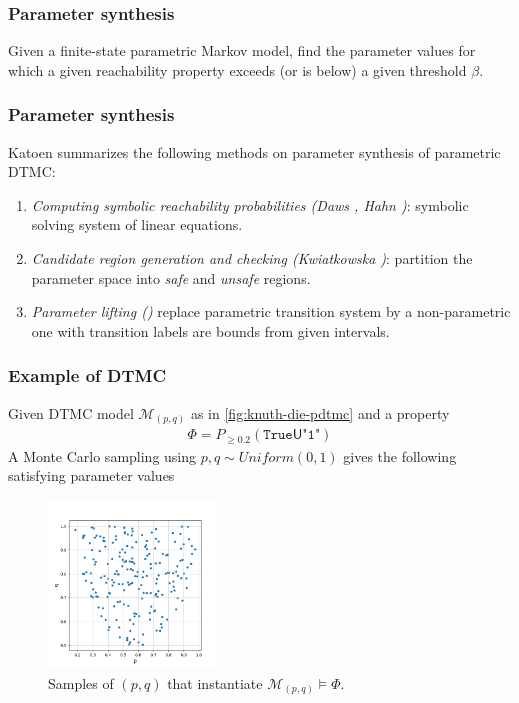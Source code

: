 \documentclass{beamer}
\begin{document}
\begin{frame}
    \frametitle{Parameter synthesis}
    \begin{definition}
        Given a finite-state parametric Markov model, find the parameter values for which a given
        reachability property exceeds (or is below) a given threshold $\beta$.
    \end{definition}
\end{frame}

\begin{frame}
    \frametitle{Parameter synthesis}
    Katoen \cite{katoen2013model} summarizes the following methods on parameter synthesis of parametric DTMC:
    \begin{enumerate}
        \item \textit{Computing symbolic reachability probabilities (Daws \cite{daws2004symbolic},
                  Hahn \cite{hahn2011probabilistic})}: symbolic solving system of linear equations.
        \item \textit{Candidate region generation and checking (Kwiatkowska
                  \cite{kwiatkowska2006symmetry})}: partition the parameter space into \textit{safe} and
              \textit{unsafe} regions.
        \item \textit{Parameter lifting (\cite{quatmann2016parameter})} replace parametric
              transition system by a non-parametric one with transition labels are bounds from given
              intervals.
    \end{enumerate}
\end{frame}

\begin{frame}
    \frametitle{Example of DTMC}
    Given DTMC model $\mathcal{M}_{(p,q)}$ as in \ref{fig:knuth-die-pdtmc} and a property
    \begin{align*}
        \Phi = P_{\geq 0.2} (\texttt{True} \mathsf{U} \texttt{"1"})
    \end{align*}
    A Monte Carlo sampling using $p,q \sim Uniform(0,1)$ gives the following satisfying parameter values
    \begin{figure}[H]
        \centering
        \includegraphics[width=0.4\textwidth]{figures/knuth_die_trueparams.png}
        \caption{Samples of $(p,q)$ that instantiate $\mathcal{M}_{(p,q)} \models \Phi$.}
        \label{fig:knuth-die-pdtmc-mc}
    \end{figure}
\end{frame}
\end{document}
